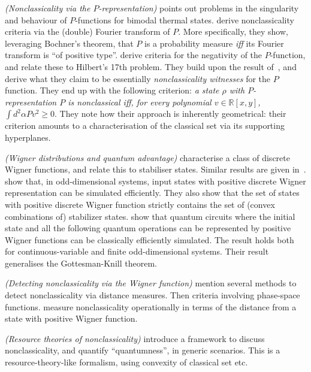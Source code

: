 \documentclass[12pt]{report}
\newcommand{\RR}{\mathbb{R}}
\newcommand{\heading}[1]{{\color{Mahogany}\emph{(#1)}}}
\begin{document}
\heading{Nonclassicality via the $P$-representation}
\textcite{wunsche2004about} points out problems in the singularity and behaviour of $P$-functions for bimodal thermal states.
\textcite{richter2002nonclassicality} derive nonclassicality criteria via the (double) Fourier transform of $P$. More specifically, they show, leveraging Bochner's theorem, that $P$ is a probability measure \emph{iff} its Fourier transform is ``of positive type''.
\textcite{korbicz2005hilbert} derive criteria for the negativity of the $P$-function, and relate these to Hilbert's 17th problem.
They build upon the result of~\parencite{richter2002nonclassicality}, and derive what they claim to be essentially \emph{nonclassicality witnesses} for the $P$ function.
They end up with the following criterion: \emph{a state $\rho$ with $P$-representation $P$ is nonclassical iff, for every polynomial $v\in\RR[x,y]$, $\int d^2\alpha P v^2\ge0$}.
They note how their approach is inherently geometrical: their criterion amounts to a characterisation of the classical set via its supporting hyperplanes.

\heading{Wigner distributions and quantum advantage}
\textcite{galvao2005discrete} characterise a class of discrete Wigner functions, and relate this to stabiliser states.
Similar results are given in~\parencite{cormick2006classicality}.
\textcite{veitch2012negative} show that, in odd-dimensional systems, input states with positive discrete Wigner representation can be simulated efficiently. They also show that the set of states with positive discrete Wigner function strictly contains the set of (convex combinations of) stabilizer states.
\textcite{mari2012positive} show that quantum circuits where the initial state and all the following quantum operations can be represented by positive Wigner functions can be classically efficiently simulated. The result holds both for continuous-variable and finite odd-dimensional systems.
Their result generalises the Gottesman-Knill theorem.

\heading{Detecting nonclassicality via the Wigner function}
\textcite{kenfack2004negativity} mention several methods to detect nonclassicality via distance measures. Then criteria involving phase-space functions.
\textcite{mari2011directly} measure nonclassicality operationally in terms of the distance from a state with positive Wigner function.

\heading{Resource theories of nonclassicality}
\textcite{sperling2015convex} introduce a framework to discuss nonclassicality, and quantify ``quantumness'', in generic scenarios. This is a resource-theory-like formalism, using convexity of classical set etc.
\end{document}
